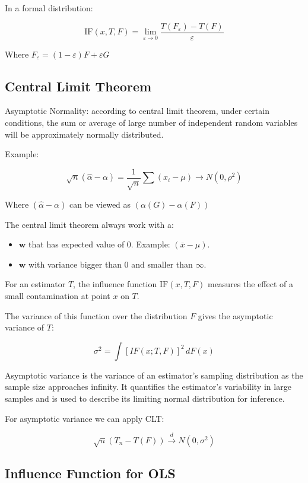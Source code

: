 \documentclass{article}
\begin{document}
In a formal distribution:

$$
\text{IF}(x, T, F) = \lim_{\varepsilon \to 0} \dfrac{T(F_\varepsilon) - T(F)}{\varepsilon}
$$

Where $F_\varepsilon = (1 - \varepsilon) F + \varepsilon G$

\subsection{Central Limit Theorem}

Asymptotic Normality: according to central limit theorem, under certain conditions, the sum or average of large number of independent random variables will be approximately normally distributed.

Example:

$$
\sqrt{n} (\hat{\alpha} - \alpha) = \frac{1}{\sqrt{n}} \sum (x_i - \mu) \to N(0, \rho^2)
$$

Where $(\hat{\alpha} - \alpha)$ can be viewed as $(\alpha (G) - \alpha (F))$

The central limit theorem always work with a:
\begin{itemize}
    \item $\textbf{w}$ that has expected value of 0. Example: $(\bar{x} - \mu)$.
    \item $\textbf{w}$ with variance bigger than 0 and smaller than $\infty$.
\end{itemize}

For an estimator $T$, the influence function $\text{IF}(x, T, F)$ measures the effect of a small contamination at point $x$ on $T$.

The variance of this function over the distribution  $F$ gives the asymptotic variance of $T$:

$$
\sigma^2 = \int [IF(x; T, F)]^2 \, dF(x)
$$

Asymptotic variance is the variance of an estimator's sampling distribution as the sample size approaches infinity. It quantifies the estimator's variability in large samples and is used to describe its limiting normal distribution for inference.

For asymptotic variance we can apply CLT:

\[
\sqrt{n}(T_n - T(F)) \xrightarrow{d} N(0, \sigma^2)
\]

\subsection{Influence Function for OLS}
\end{document}
